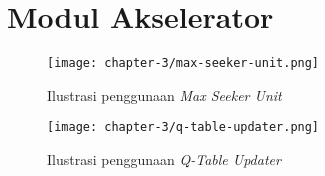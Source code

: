 \chapter{Modul Akselerator}
\label{appendix:modul-akselerator}

\begin{figure}[H]
	\centering
	\begin{sideways}
		\texttt{[image: chapter-3/max-seeker-unit.png]}
	\end{sideways}
	\caption{Ilustrasi penggunaan \textit{Max Seeker Unit}}
	\label{fig:max-seeker-unit}
\end{figure}

\begin{figure}[H]
	\centering
	\begin{sideways}
		\texttt{[image: chapter-3/q-table-updater.png]}
	\end{sideways}
	\caption{Ilustrasi penggunaan \textit{Q-Table Updater}}
	\label{fig:q-table-updater}
\end{figure}
